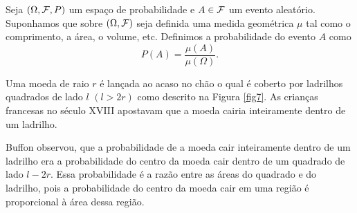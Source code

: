 \begin{frame}
 \begin{defi}  Seja $(\Omega ,{\cal F}, P)$ um espaço de probabilidade e  $A \in {\cal F}$ um evento aleatório. Suponhamos que sobre $(\Omega ,{\cal F})$ seja definida uma medida geométrica $\mu$ tal como o comprimento, a área, o volume, etc. Definimos a probabilidade do evento $A$ como 
\begin{equation}
\label{pgeo}
P(A) = \frac{\mu(A)}{\mu(\Omega)}.
\end{equation}
\end{defi}

\begin{exem} 
Uma moeda de raio $r$ é lançada ao acaso no chão o qual é coberto por
ladrilhos quadrados de lado $l$ $(l > 2r)$ como descrito na Figura \ref{fig7}. As crianças francesas no século XVIII apostavam que a moeda
cairia inteiramente dentro de um ladrilho. 

Buffon observou, que a probabilidade de a moeda cair inteiramente dentro
de um ladrilho era a probabilidade do centro da moeda cair dentro de um
quadrado de lado $l - 2r$. Essa probabilidade é a razão entre as áreas do quadrado e do ladrilho,
pois a probabilidade do centro da moeda cair em uma região é proporcional
à área dessa região.


\end{exem}
\end{frame}

